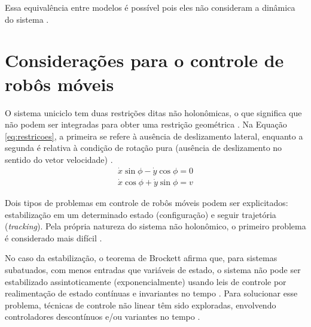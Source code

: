 Essa equivalência entre modelos é possível pois eles não consideram a dinâmica
do sistema \cite{lavalle2006planning}.

	
\section{Considerações para o controle de robôs móveis}

O sistema uniciclo tem duas restrições ditas não holonômicas, o que significa
que não podem ser integradas para obter uma restrição geométrica
\cite{Oriolo2013}.
Na Equação \ref{eq:restricoes}, a primeira se refere à ausência de deslizamento
lateral, enquanto a segunda é relativa à condição de rotação pura (ausência de
deslizamento no sentido do vetor velocidade) \cite[pg.
955]{book:AdvancedDynamics}.
\begin{equation}
	\label{eq:restricoes}
	\begin{matrix}
	\dot{x}\sin{\phi} - \dot{y}\cos{\phi} = 0 
	\\
	\dot{x}\cos{\phi} + \dot{y}\sin{\phi} = v
	\end{matrix}
\end{equation}

Dois tipos de problemas em controle de robôs móveis podem ser explicitados:
estabilização em um determinado estado (configuração) e seguir trajetória
(\textit{tracking}). Pela própria natureza do sistema não holonômico, o primeiro
problema é considerado mais difícil \cite{tese:franca}.

No caso da estabilização, o teorema de Brockett afirma que, para sistemas
subatuados, com menos entradas que variáveis de estado, o sistema não pode ser
estabilizado assintoticamente (exponencialmente) usando leis de controle por
realimentação de estado contínuas e invariantes no tempo
\cite{artigo:ASTOLFI1995661, inbook:Ravi_Mumbai}.
Para solucionar esse problema, técnicas de controle não linear têm sido
exploradas, envolvendo controladores descontínuos e/ou variantes no tempo
\cite{tese:franca}.  

